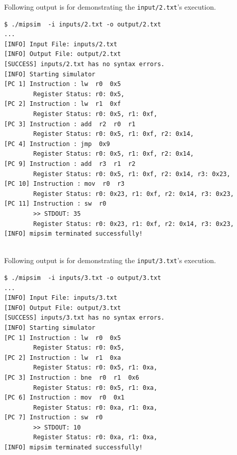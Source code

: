 \documentclass{homework}
\begin{document}
Following output is for demonstrating the \texttt{input/2.txt}'s execution. 
\\
\begin{center}
\begin{code}
\begin{verbatim}
$ ./mipsim  -i inputs/2.txt -o output/2.txt
...
[INFO] Input File: inputs/2.txt
[INFO] Output File: output/2.txt
[SUCCESS] inputs/2.txt has no syntax errors.
[INFO] Starting simulator
[PC 1] Instruction : lw  r0  0x5
        Register Status: r0: 0x5,
[PC 2] Instruction : lw  r1  0xf
        Register Status: r0: 0x5, r1: 0xf,
[PC 3] Instruction : add  r2  r0  r1
        Register Status: r0: 0x5, r1: 0xf, r2: 0x14,
[PC 4] Instruction : jmp  0x9
        Register Status: r0: 0x5, r1: 0xf, r2: 0x14,
[PC 9] Instruction : add  r3  r1  r2
        Register Status: r0: 0x5, r1: 0xf, r2: 0x14, r3: 0x23,
[PC 10] Instruction : mov  r0  r3
        Register Status: r0: 0x23, r1: 0xf, r2: 0x14, r3: 0x23,
[PC 11] Instruction : sw  r0
        >> STDOUT: 35
        Register Status: r0: 0x23, r1: 0xf, r2: 0x14, r3: 0x23,
[INFO] mipsim terminated successfully!
\end{verbatim}
\end{code}
\end{center}
\\
Following output is for demonstrating the \texttt{input/3.txt}'s execution. 
\\
\begin{center}
\begin{code}
\begin{verbatim}
$ ./mipsim  -i inputs/3.txt -o output/3.txt
...
[INFO] Input File: inputs/3.txt
[INFO] Output File: output/3.txt
[SUCCESS] inputs/3.txt has no syntax errors.
[INFO] Starting simulator
[PC 1] Instruction : lw  r0  0x5
        Register Status: r0: 0x5,
[PC 2] Instruction : lw  r1  0xa
        Register Status: r0: 0x5, r1: 0xa,
[PC 3] Instruction : bne  r0  r1  0x6
        Register Status: r0: 0x5, r1: 0xa,
[PC 6] Instruction : mov  r0  0x1
        Register Status: r0: 0xa, r1: 0xa,
[PC 7] Instruction : sw  r0
        >> STDOUT: 10
        Register Status: r0: 0xa, r1: 0xa,
[INFO] mipsim terminated successfully!
\end{verbatim}
\end{code}
\end{center}
\end{document}
